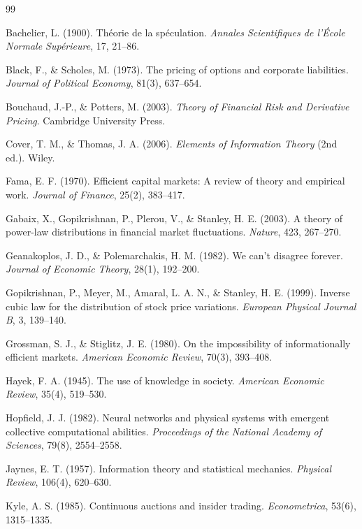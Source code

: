 \documentclass[12pt,a4paper]{article}
\theoremstyle{definition}
\begin{document}
\begin{thebibliography}{99}

Bachelier, L. (1900). Th\'{e}orie de la sp\'{e}culation. \textit{Annales Scientifiques de l'\'{E}cole Normale Sup\'{e}rieure}, 17, 21--86.

Black, F., \& Scholes, M. (1973). The pricing of options and corporate liabilities. \textit{Journal of Political Economy}, 81(3), 637--654.

Bouchaud, J.-P., \& Potters, M. (2003). \textit{Theory of Financial Risk and Derivative Pricing}. Cambridge University Press.

Cover, T. M., \& Thomas, J. A. (2006). \textit{Elements of Information Theory} (2nd ed.). Wiley.

Fama, E. F. (1970). Efficient capital markets: A review of theory and empirical work. \textit{Journal of Finance}, 25(2), 383--417.

Gabaix, X., Gopikrishnan, P., Plerou, V., \& Stanley, H. E. (2003). A theory of power-law distributions in financial market fluctuations. \textit{Nature}, 423, 267--270.

Geanakoplos, J. D., \& Polemarchakis, H. M. (1982). We can't disagree forever. \textit{Journal of Economic Theory}, 28(1), 192--200.

Gopikrishnan, P., Meyer, M., Amaral, L. A. N., \& Stanley, H. E. (1999). Inverse cubic law for the distribution of stock price variations. \textit{European Physical Journal B}, 3, 139--140.

Grossman, S. J., \& Stiglitz, J. E. (1980). On the impossibility of informationally efficient markets. \textit{American Economic Review}, 70(3), 393--408.

Hayek, F. A. (1945). The use of knowledge in society. \textit{American Economic Review}, 35(4), 519--530.

Hopfield, J. J. (1982). Neural networks and physical systems with emergent collective computational abilities. \textit{Proceedings of the National Academy of Sciences}, 79(8), 2554--2558.

Jaynes, E. T. (1957). Information theory and statistical mechanics. \textit{Physical Review}, 106(4), 620--630.

Kyle, A. S. (1985). Continuous auctions and insider trading. \textit{Econometrica}, 53(6), 1315--1335.


\end{thebibliography}
\end{document}
